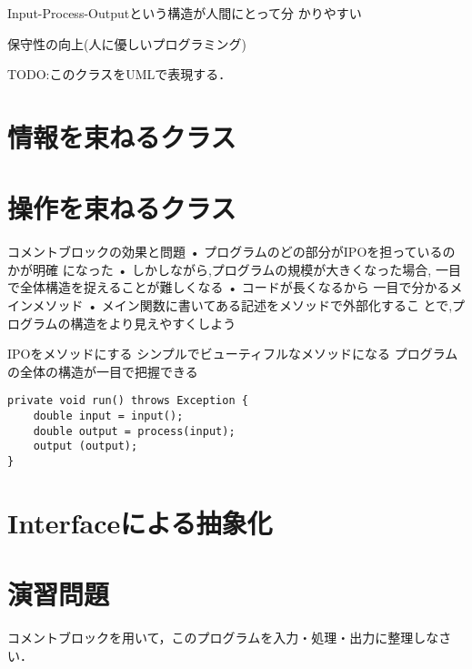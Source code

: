 \documentclass[a4j,papersize]{jsbook}
\begin{document}
 Input-Process-Outputという構造が人間にとって分
かりやすい

 保守性の向上(人に優しいプログラミング)

TODO:このクラスをUMLで表現する．

\section{情報を束ねるクラス}

\section{操作を束ねるクラス}

コメントブロックの効果と問題
• プログラムのどの部分がIPOを担っているのかが明確
になった
• しかしながら,プログラムの規模が大きくなった場合,
一目で全体構造を捉えることが難しくなる
• コードが長くなるから
一目で分かるメインメソッド
• メイン関数に書いてある記述をメソッドで外部化するこ
とで,プログラムの構造をより見えやすくしよう

IPOをメソッドにする
シンプルでビューティフルなメソッドになる
 プログラムの全体の構造が一目で把握できる

\begin{verbatim}
private void run() throws Exception {
    double input = input();
    double output = process(input);
    output (output);
}
\end{verbatim}



\section{Interfaceによる抽象化}






\newpage
\section{演習問題}

\begin{演習}
 コメントブロックを用いて，このプログラムを入力・処理・出力に整理しなさ
 い．

\end{演習}
\end{document}
